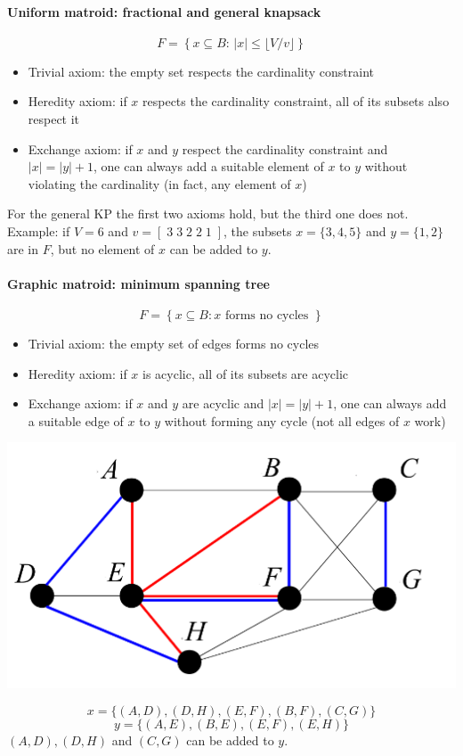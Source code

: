 \documentclass[11pt]{article}
\begin{document}
	
	\paragraph{Uniform matroid: fractional and general knapsack}
	$$ F = \left\{x \subseteq B : \, |x| \leq \lfloor V / v \rfloor \right\}$$
	
	\begin{itemize}
		\item Trivial axiom: the empty set respects the cardinality constraint
		\item Heredity axiom: if $x$ respects the cardinality constraint, all of its subsets also respect it
		\item Exchange axiom: if $x$ and $y$ respect the cardinality constraint and $|x| = |y| + 1$, one can always add a suitable element of $x$ to $y$ without violating the cardinality (in fact, any element of $x$)
	\end{itemize}
	
	For the general KP the first two axioms hold, but the third one does not.\\
	Example: if $V = 6$ and $v = [\; 3 \; 3 \; 2 \; 2 \; 1 \; ]$, the subsets $x = \{3, 4, 5\}$ and $y = \{1, 2\}$ are in $F$, but no element of $x$ can be added to $y$.\\
	
	\newpage
	
	\paragraph{Graphic matroid: minimum spanning tree}
	$$ F = \left\{x \subseteq B : x \text{ forms no cycles }\right\}$$
	
	\begin{itemize}
		\item Trivial axiom: the empty set of edges forms no cycles
		\item Heredity axiom: if $x$ is acyclic, all of its subsets are acyclic
		\item Exchange axiom: if $x$ and $y$ are acyclic and $|x| = |y | + 1$, one can always add a suitable edge of $x$ to $y$ without forming any cycle (not all edges of $x$ work)
	\end{itemize}
	\begin{center}
		\includegraphics[width=0.6\columnwidth]{img/matroid1}
	\end{center}
	$$ x = \{(A, D) , (D, H) , (E , F ) , (B, F ) , (C , G )\} $$
	$$ y = \{(A, E ) , (B, E ) , (E , F ) , (E , H)\} $$
	$(A, D), (D, H)$ and $(C , G )$ can be added to $y$.\\
	
\end{document}
